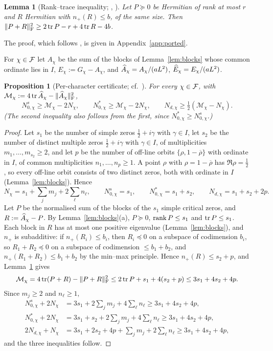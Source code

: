 \documentclass[11pt]{amsart}
\newtheorem{proposition}[theorem]{Proposition}
\newtheorem{lemma}[theorem]{Lemma}
\theoremstyle{definition}
\theoremstyle{remark}
\numberwithin{equation}{section}
\begin{document}
\begin{lemma}[Rank--trace inequality; {\cite[Lemma~3.2]{AF26}, \cite[Lemma~8.2]{HY26}}]\label{lem:ranktrace}
Let $P\succeq0$ be Hermitian of rank at most $r$ and $R$ Hermitian with $n_+(R)\le b$, of the same size. Then $\|P+R\|_\mathrm F^2\ge2\operatorname{tr} P-r+4\operatorname{tr} R-4b$.
\end{lemma}
The proof, which follows \cite{AF26,HY26}, is given in Appendix~\ref{app:ported}.

For $\chi\in\mathcal F$ let $A_\chi$ be the sum of the blocks of Lemma~\ref{lem:blocks} whose common ordinate lies in $I$, $E_\chi:=G_\chi-A_\chi$, and $\widehat A_\chi=A_\chi/(aL^2)$, $\widehat E_\chi=E_\chi/(aL^2)$.

\begin{proposition}[Per-character certificate; cf.\ {\cite[Prop.~8.3]{HY26}}]\label{prop:perchi}
For every $\chi\in\mathcal F$, with $\mathcal M_\chi:=4\operatorname{tr}\widehat A_\chi-\|\widehat A_\chi\|_\mathrm F^2$,
\[
N^s_{0,\chi}\ge\mathcal M_\chi-2N_\chi,\qquad N^*_{0,\chi}\ge\mathcal M_\chi-2N_\chi,\qquad N_{d,\chi}\ge\tfrac12(\mathcal M_\chi-N_\chi).
\]
(The second inequality also follows from the first, since $N^*_{0,\chi}\ge N^s_{0,\chi}$.)
\end{proposition}
\begin{proof}
Let $s_1$ be the number of simple zeros $\frac12+i\gamma$ with $\gamma\in I$, let $s_2$ be the number of distinct multiple zeros $\frac12+i\gamma$ with $\gamma\in I$, of multiplicities $m_1,\dots,m_{s_2}\ge2$, and let $p$ be the number of off-line orbits $\{\rho,1-\overline\rho\}$ with ordinate in $I$, of common multiplicities $n_1,\dots,n_p\ge1$. A point $\rho$ with $\rho=1-\overline\rho$ has $\Re\rho=\frac12$, so every off-line orbit consists of two distinct zeros, both with ordinate in $I$ (Lemma~\ref{lem:blocks}). Hence
\[
N_\chi=s_1+\sum_jm_j+2\sum_\ell n_\ell,\qquad N^s_{0,\chi}=s_1,\qquad N^*_{0,\chi}=s_1+s_2,\qquad N_{d,\chi}=s_1+s_2+2p .
\]
Let $P$ be the normalised sum of the blocks of the $s_1$ simple critical zeros, and $R:=\widehat A_\chi-P$. By Lemma~\ref{lem:blocks}(a), $P\succeq0$, $\operatorname{rank} P\le s_1$ and $\operatorname{tr} P\le s_1$. Each block in $R$ has at most one positive eigenvalue (Lemma~\ref{lem:blocks}), and $n_+$ is subadditive: if $n_+(R_i)\le b_i$, then $R_i\preceq0$ on a subspace of codimension $b_i$, so $R_1+R_2\preceq0$ on a subspace of codimension $\le b_1+b_2$, and $n_+(R_1+R_2)\le b_1+b_2$ by the min--max principle. Hence $n_+(R)\le s_2+p$, and Lemma~\ref{lem:ranktrace} gives
\[
\mathcal M_\chi=4\operatorname{tr}(P+R)-\|P+R\|_\mathrm F^2\le2\operatorname{tr} P+s_1+4(s_2+p)\le3s_1+4s_2+4p .
\]
Since $m_j\ge2$ and $n_\ell\ge1$,
\begin{align*}
N^s_{0,\chi}+2N_\chi&=3s_1+2\textstyle\sum_jm_j+4\sum_\ell n_\ell\ge3s_1+4s_2+4p,\\
N^*_{0,\chi}+2N_\chi&=3s_1+s_2+2\textstyle\sum_jm_j+4\sum_\ell n_\ell\ge3s_1+4s_2+4p,\\
2N_{d,\chi}+N_\chi&=3s_1+2s_2+4p+\textstyle\sum_jm_j+2\sum_\ell n_\ell\ge3s_1+4s_2+4p,
\end{align*}
and the three inequalities follow.
\end{proof}
\end{document}
